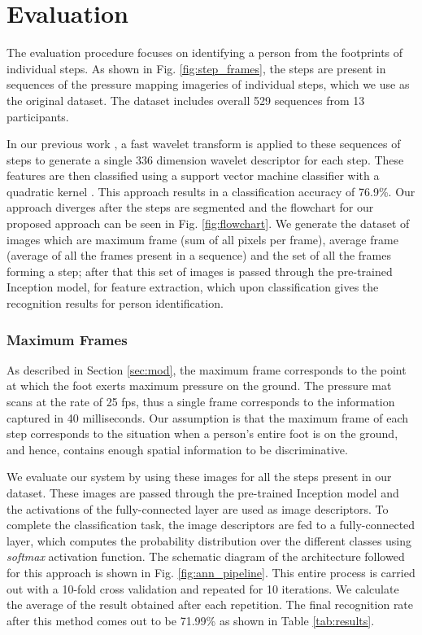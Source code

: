 
\section{Evaluation}
	\label{sec:eval}
The evaluation procedure focuses on identifying a person from the footprints of individual steps. 
As shown in Fig. \ref{fig:step_frames}, the steps are present in sequences of the pressure mapping imageries of individual steps, which we use as the original dataset. The dataset includes overall 529 sequences from 13 participants. 

In our previous work \cite{blind}, a fast wavelet transform is applied to these sequences of steps to generate a single 336 dimension wavelet descriptor for each step. These features are then classified using a support vector machine classifier with a quadratic kernel \cite{cortes1995support}. This approach results in a classification accuracy of 76.9\%.
Our approach diverges after the steps are segmented and the flowchart for our proposed approach can be seen in Fig. \ref{fig:flowchart}. We generate the dataset of images which are maximum frame (sum of all pixels per frame), average frame (average of all the frames present in a sequence) and the set of all the frames forming a step; after that this set of images is passed through the pre-trained Inception model, for feature extraction, which upon classification gives the recognition results for person identification.

\subsubsection{Maximum Frames}
As described in Section \ref{sec:mod}, the maximum frame corresponds to the point at which the foot exerts maximum pressure on the ground. The pressure mat scans at the rate of 25 fps, thus a single frame corresponds to the information captured in 40 milliseconds. Our assumption is that the maximum frame of each step corresponds to the situation when a person's entire foot is on the ground, and hence, contains enough spatial information to be discriminative. 
\par
We evaluate our system by using these images for all the steps present in our dataset. These images are passed through the pre-trained Inception model and the activations of the fully-connected layer are used as image descriptors. To complete the classification task, the image descriptors are fed to a fully-connected layer, which computes the probability distribution over the different classes using \emph{softmax} activation function. The schematic diagram of the architecture followed for this approach is shown in Fig. \ref{fig:ann_pipeline}. This entire process is carried out with a 10-fold cross validation and repeated for 10 iterations. We calculate the average of the result obtained after each repetition. The final recognition rate after this method comes out to be 71.99\% as shown in Table \ref{tab:results}. 

